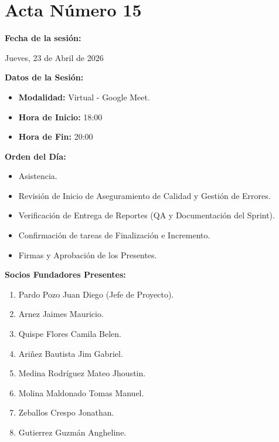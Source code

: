 \newpage
\section{Acta Número 15}
\label{sec:acta15}

\noindent \textbf{Fecha de la sesión:}\par
Jueves, 23 de Abril de 2026

\vspace*{0.5cm}
\noindent \textbf{Datos de la Sesión:}
\vspace{-0.2cm}
\begin{itemize}[noitemsep]
    \item \textbf{Modalidad:} Virtual - Google Meet.
    \item \textbf{Hora de Inicio:} 18:00
    \item \textbf{Hora de Fin:} 20:00
\end{itemize}

\vspace*{0.5cm}
\noindent \textbf{Orden del Día:}
\vspace{-0.2cm}
\begin{itemize}[noitemsep]
    \item Asistencia.
    \item Revisión de Inicio de Aseguramiento de Calidad y Gestión de Errores.
    \item Verificación de Entrega de Reportes (QA y Documentación del Sprint).
    \item Confirmación de tareas de Finalización e Incremento.
    \item Firmas y Aprobación de los Presentes.
\end{itemize}

\vspace*{0.5cm}
\noindent \textbf{Socios Fundadores Presentes:}
\vspace{-0.2cm}
\begin{enumerate}[noitemsep]
    \item Pardo Pozo Juan Diego (Jefe de Proyecto).
    \item Arnez Jaimes Mauricio.
    \item Quispe Flores Camila Belen.
    \item Ariñez Bautista Jim Gabriel.
    \item Medina Rodríguez Mateo Jhoustin.
    \item Molina Maldonado Tomas Manuel.
    \item Zeballos Crespo Jonathan.
    \item Gutierrez Guzmán Angheline.
\end{enumerate}

